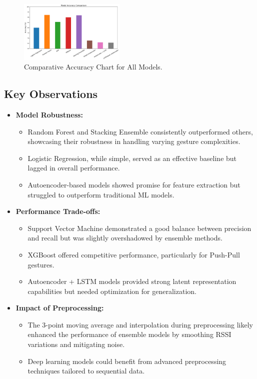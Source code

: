\documentclass[10pt,twocolumn,letterpaper]{article}
\begin{document}
\begin{figure}[h]
  \centering
  \includegraphics[width=0.45\textwidth]{figures/comparative_accuracy_chart.png}
  \caption{Comparative Accuracy Chart for All Models.}
  \label{fig:comparative_accuracy}
\end{figure}

\subsection{Key Observations}

\begin{itemize}
  \item \textbf{Model Robustness:}
    \begin{itemize}
      \item Random Forest and Stacking Ensemble consistently outperformed others, showcasing their robustness in handling varying gesture complexities.
      \item Logistic Regression, while simple, served as an effective baseline but lagged in overall performance.
      \item Autoencoder-based models showed promise for feature extraction but struggled to outperform traditional ML models.
    \end{itemize}

  \item \textbf{Performance Trade-offs:}
    \begin{itemize}
      \item Support Vector Machine demonstrated a good balance between precision and recall but was slightly overshadowed by ensemble methods.
      \item XGBoost offered competitive performance, particularly for Push-Pull gestures.
      \item Autoencoder + LSTM models provided strong latent representation capabilities but needed optimization for generalization.
    \end{itemize}

  \item \textbf{Impact of Preprocessing:}
    \begin{itemize}
      \item The 3-point moving average and interpolation during preprocessing likely enhanced the performance of ensemble models by smoothing RSSI variations and mitigating noise.
      \item Deep learning models could benefit from advanced preprocessing techniques tailored to sequential data.
    \end{itemize}
\end{itemize}
\end{document}
